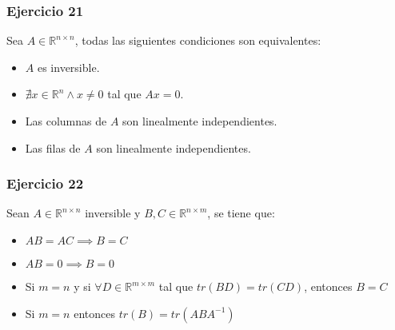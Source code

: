 \subsubsection{Ejercicio 21}\label{subsubsec:guia_1_ej_21}

Sea $A \in \mathbb{R}^{n \times n}$, todas las siguientes condiciones son equivalentes:
\begin{itemize}
    \item $A$ es inversible.
    \item $\nexists x \in \mathbb{R}^{n} \land x\neq 0$ tal que $Ax = 0$.
    \item Las columnas de $A$ son linealmente independientes.
    \item Las filas de $A$ son linealmente independientes.
\end{itemize}

\subsubsection{Ejercicio 22}\label{subsubsec:guia_1_ej_22}

Sean $A \in \mathbb{R}^{n \times n}$ inversible y $B, C \in \mathbb{R}^{n \times m}$, se tiene que:

\begin{itemize}
    \item $AB = AC \implies B = C$
    \item $AB = 0 \implies B = 0$
    \item Si $m = n$ y si $\forall D \in \mathbb{R}^{m \times m}$ tal que $tr(BD) = tr(CD)$, entonces $B = C$
    \item Si $m = n$ entonces $tr(B) = tr(ABA^{-1})$
\end{itemize}
